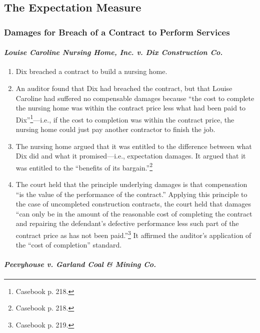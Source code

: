 \subsection{The Expectation Measure}

\subsubsection{Damages for Breach of a Contract to Perform Services}

\paragraph{\emph{Louise Caroline Nursing Home, Inc. v. Dix Construction Co.}}

\begin{enumerate}
    \item Dix breached a contract to build a nursing home.
    \item An auditor found that Dix had breached the contract, but that Louise 
    Caroline had suffered no compensable damages because ``the cost to 
    complete the nursing home was within the contract price less what had been 
    paid to Dix''\footnote{Casebook p. 218.}---i.e., if the cost to completion 
    was within the contract price, the nursing home could just pay another 
    contractor to finish the job.
    \item The nursing home argued that it was entitled to the difference 
    between what Dix did and what it promised---i.e., expectation damages. It 
    argued that it was entitled to the ``benefits of its 
    bargain.''\footnote{Casebook p. 218.} 
    \item The court held that the principle underlying damages is that 
    compensation ``is the value of the performance of the contract.'' Applying 
    this principle to the case of uncompleted construction contracts, the 
    court held that damages ``can only be in the amount of the reasonable cost 
    of completing the contract and repairing the defendant's defective 
    performance less such part of the contract price as has not been 
    paid.''\footnote{Casebook p. 219.} It affirmed the auditor's application 
    of the ``cost of completion'' standard.
\end{enumerate}

\paragraph{\emph{Peevyhouse v. Garland Coal \& Mining Co.}}

